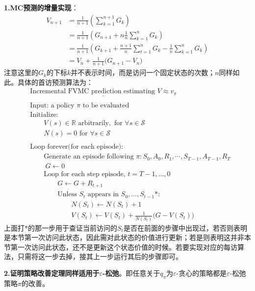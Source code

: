\documentclass{ctexart}
\begin{document}
\textbf{1.MC预测的增量实现}：
\begin{align*}
V_{n+1}&= \frac1{n+1}\left( \sum_{k=1}^{n+1}G_k \right)\\
&= \frac1{n+1} \left(G_{n+1}+n\frac1n\sum_{k=1}^nG_k\right)\\
&= \frac1{n+1} \left(G_{k+1}+\frac{n+1}n\sum_{t=1}^nG_k-\frac1n\sum_{k=1}^nG_k\right)\\
&= V_n + \frac1{n+1}\bigl(G_{n+1}-V_n\bigr)
\end{align*}
注意这里的$G_k$的下标$k$并不表示时间，而是访问一个固定状态的次数；$n$同样如此。具体的首访预测算法为：
\begin{align*}
 &\underline{\text{Incremental FVMC prediction estimating }V\approx v_\pi}\\
 \\
 &\text{Input: a policy }\pi\text{ to be evaluated}\\
&\text{Initialize:}\\
&\qquad V(s)\in\mathbb R \text{ arbitrarily}, \text{ for } \forall s\in\mathcal S\\
&\qquad N(s)=0  \text{ for } \forall s\in\mathcal S\\
\\
&\text{Loop forever(for each episode):}\\
&\qquad \text{Generate an episode following }\pi:S_0, A_0, R_1,\cdots, S_{T-1},A_{T-1},R_T\\
&\qquad\ G \leftarrow 0\\
&\qquad \text{Loop for each step episode, }t=T-1,\dots,0\\
&\qquad\qquad G \leftarrow G + R_{t+1}\\
&\qquad\qquad \text{Unless }S_t\text{ appears in }S_0,\dots,S_{t-1}*:\\
&\qquad\qquad\qquad N(S_t) \leftarrow N(S_t) + 1\\
&\qquad\qquad\qquad V(S_t) \leftarrow V(S_t) + \frac1{N(S_t)}\bigl(G-V(S_t)\bigr)
\end{align*}
上面打$*$的那一步用于查证当前访问的$S_t$是否在前面的步骤中出现过，若否则表明是本节第一次访问此状态，因此需对此状态的价值进行更新；若是则表明这并非本节第一次访问此状态，还不是更新这个状态价值的时候。若要实现对应的每访算法，只需将这一步去掉，接其上一步运行其后的步骤即可。



\textbf{2.证明策略改善定理同样适用于$\varepsilon$-松弛}。即任意关于$q_\pi$为$\varepsilon$-贪心的策略都是$\varepsilon$-松弛策略$\pi$的改善。
\end{document}
